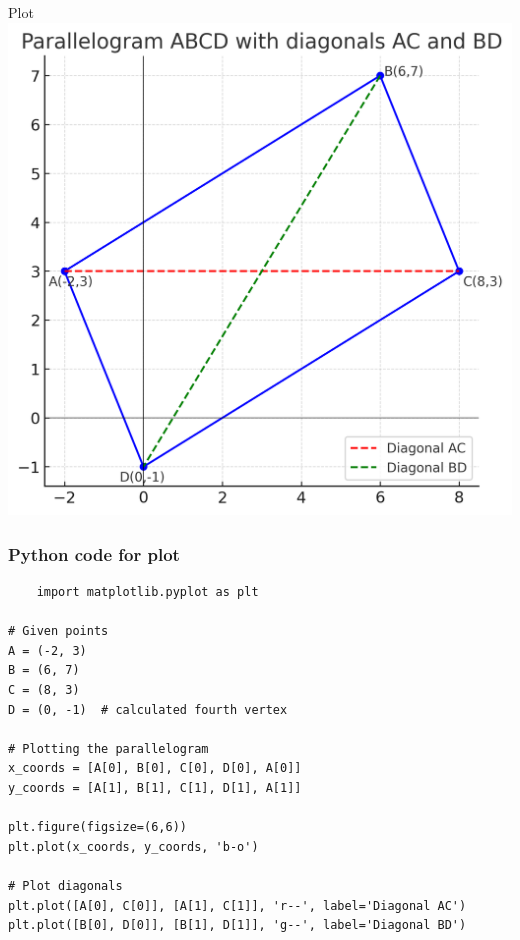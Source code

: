 \documentclass{beamer}
\begin{document}
\begin{frame}{Plot}
    \centering
    \includegraphics[width=\columnwidth, height=0.8\textheight, keepaspectratio]{figs/fig1.png} 
    \label{The visual of the parallelogram with vertices A, B, C, D and diagonals shown}
\end{frame}

\begin{frame}[fragile]
\frametitle{Python code for plot}
\begin{lstlisting}
    import matplotlib.pyplot as plt

# Given points
A = (-2, 3)
B = (6, 7)
C = (8, 3)
D = (0, -1)  # calculated fourth vertex

# Plotting the parallelogram
x_coords = [A[0], B[0], C[0], D[0], A[0]]
y_coords = [A[1], B[1], C[1], D[1], A[1]]

plt.figure(figsize=(6,6))
plt.plot(x_coords, y_coords, 'b-o')

# Plot diagonals
plt.plot([A[0], C[0]], [A[1], C[1]], 'r--', label='Diagonal AC')
plt.plot([B[0], D[0]], [B[1], D[1]], 'g--', label='Diagonal BD')


\end{lstlisting}
\end{frame}
\end{document}
